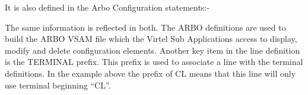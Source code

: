 \documentclass[letterpaper,10pt,english]{sphinxmanual}
\begin{document}

It is also defined in the Arbo Configuration statements:-

\begin{sphinxVerbatim}[commandchars=\\\{\}]
                                          
                                          
                                         
                
                                            
                                         
                                              
                                                
                                       
                                           
                                               
                                             
                                             
\end{sphinxVerbatim}

The same information is reflected in both. The ARBO definitions are used to build the ARBO VSAM file which the Virtel Sub Applications access to display, modify and delete configuration elements. Another key item in the line definition is the TERMINAL prefix. This prefix is used to associate a line with the terminal definitions. In the example above the prefix of CL means that this line will only use terminal beginning “CL”.
\end{document}
